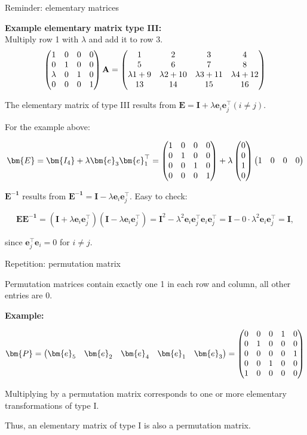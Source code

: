 \begin{vbframe}{Reminder: elementary matrices}
\lz

\textbf{Example elementary matrix type III:}\\
Multiply row 1 with $\lambda$ and add it to row 3.
$$
\begin{pmatrix}  1 & 0 & 0 & 0 \\
      0 & 1 & 0 & 0 \\
      \lambda & 0 & 1 & 0 \\
      0 & 0 & 0 & 1  \end{pmatrix}
\mathbf{A}
= \begin{pmatrix} 1 & 2 & 3 & 4 \\ 5 & 6 & 7 & 8 \\
       \lambda 1+9 & \lambda 2+10 & \lambda 3+11 & \lambda 4+12 \\ 13 & 14 & 15 & 16 \end{pmatrix}
$$

\framebreak

The elementary matrix of type III results from
$\bm{E} = \bm{I} + \lambda \bm{e}_i \bm{e}^{\top}_j (i \not= j)$.

For the example above:

$$
  \bm{E} = \bm{I_4} + \lambda \bm{e}_3 \bm{e}^{\top}_1
         = \mat{ 1 & 0 & 0 & 0 \\ 0 & 1 & 0 & 0 \\ 0 & 0 & 1 & 0 \\ 0 & 0 & 0 & 1 } +
           \lambda \mat{0 \\ 0 \\ 1 \\ 0} \mat{1 & 0 & 0 & 0}
$$

\lz

$\bm{E^{-1}}$ results from $\bm{E^{-1}} = \bm{I} - \lambda \bm{e}_i \bm{e}^{\top}_j$. Easy to check:

$$
  \bm{E E^{-1}} = (\bm{I} + \lambda \bm{e}_i \bm{e}^{\top}_j) (\bm{I} - \lambda \bm{e}_i \bm{e}^{\top}_j)
                = \bm{I}^2 - \lambda^2 \bm{e}_i \bm{e}^{\top}_j \bm{e}_i \bm{e}^{\top}_j
                = \bm{I} - 0 \cdot \lambda^2 \bm{e}_i \bm{e}^{\top}_j
                = \bm{I},
$$

since $\bm{e}^{\top}_j \bm{e}_i = 0$ for $i \neq j$.

\end{vbframe}

\begin{vbframe}{Repetition: permutation matrix}

Permutation matrices contain exactly one 1 in each row and column,
all other entries are 0. 
\lz

\textbf{Example:}

$$
  \bm{P} = \mat{\bm{e}_5 & \bm{e}_2 & \bm{e}_4 & \bm{e}_1 & \bm{e}_3}
         = \mat{0 & 0 & 0 & 1 & 0 \\
                0 & 1 & 0 & 0 & 0 \\
                0 & 0 & 0 & 0 & 1 \\
                0 & 0 & 1 & 0 & 0 \\
                1 & 0 & 0 & 0 & 0}
$$

Multiplying by a permutation matrix corresponds to one or more elementary transformations of type I.

Thus, an elementary matrix of type I is also a permutation matrix.

\end{vbframe}

